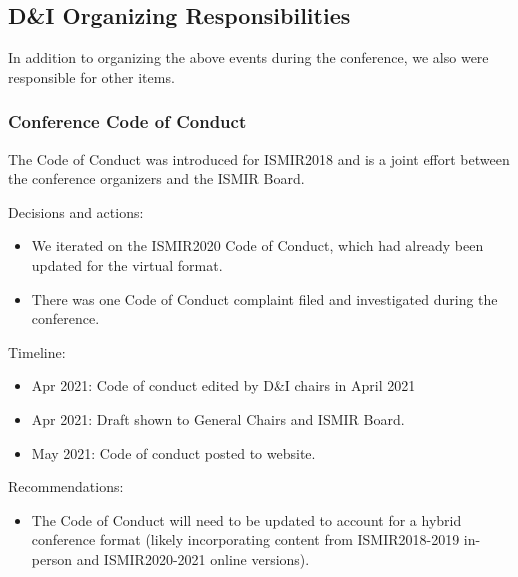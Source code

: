 \documentclass[%
10pt,								%
titlepage,						%
]
{scrartcl}
\begin{document}
    \subsection{D\&I Organizing Responsibilities}
        In addition to organizing the above events during the conference, we also were responsible for other items.
        
        \subsubsection{Conference Code of Conduct}
            The Code of Conduct was introduced for ISMIR2018 and is a joint effort between the conference organizers and the ISMIR Board.
            
            Decisions and actions:
            \begin{itemize}
                \item   We iterated on the ISMIR2020 Code of Conduct, which had already been updated for the virtual format.
                \item   There was one Code of Conduct complaint filed and investigated during the conference.
            \end{itemize}

            Timeline:
            \begin{itemize}
                \item   Apr 2021: Code of conduct edited by D\&I chairs in April 2021
                \item   Apr 2021: Draft shown to General Chairs and ISMIR Board.
                \item   May 2021: Code of conduct posted to website.
            \end{itemize}

            Recommendations:
            \begin{itemize}
                \item   The Code of Conduct will need to be updated to account for a hybrid conference format (likely incorporating content from ISMIR2018-2019 in-person and ISMIR2020-2021 online versions).
            \end{itemize}
\end{document}
